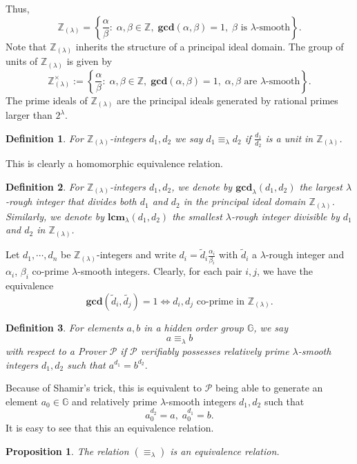 \documentclass[11pt, lettersize, notitlepage, leqno, footskip=0.6cm]{article}
\newcommand{\bz}{\mathbb Z}
\newcommand{\LRA}{\Longleftrightarrow}
\newcommand{\eqlam}{\equiv_{\lam}}
\newcommand{\wti}{\widetilde}
\newcommand{\mc}{\mathcal}
\newcommand{\mb}{\mathbb}
\newcommand{\mbf}{\mathbf}
\newcommand{\al}{\alpha}
\newcommand{\be}{\beta}
\newcommand{\lam}{\lambda}
\newcommand{\lamb}{\lambda}
\newcommand{\bzlam}{\bz_{(\lam)}}
\newcommand{\vs}{\vspace{-0.15cm}}
\newcommand{\noin}{\noindent}
\newcommand{\LCM}{\mbf{lcm}}
\newcommand{\GCD}{\mbf{gcd}}
\newtheorem{Prop}[Thm]{Proposition}
\newtheorem{Def}{Definition}[section]
\numberwithin{equation}{section}
\begin{document}
\noindent Thus, \vs $$\bz_{(\lamb)} = \left\{\frac{\al}{\be}:\; \al,\be\in\bz,\;\GCD(\al,\be) = 1,\; \be \text{ is } \lamb\text{-smooth}\right\}.$$ Note that $\bz_{(\lamb)}$ inherits the structure of a principal ideal domain. The group of units of $\bzlam$ is given by $$\bzlam^{\times} := \left\{\frac{\al}{\be}:\; \al,\be\in\bz,\;\GCD(\al,\be) = 1,\; \al, \be \text{ are } \lamb\text{-smooth}\right\}. $$ The prime ideals of $\bz_{(\lamb)}$ are the principal ideals generated by rational primes larger than $2^{\lamb}$.

\begin{Def} For $\bzlam$-integers $d_1,d_2$ we say $d_1\eqlam d_2$ if $\frac{d_1}{d_2}$ is a unit in $\bzlam$.\end{Def}

\noin This is clearly a homomorphic equivalence relation.

\begin{Def} For $\bzlam$-integers $d_1,d_2$, we denote by $\GCD_{\lam}(d_1,d_2)$ the largest $\lam$-rough integer that divides both $d_1$ and $d_2$ in the principal ideal domain $\bzlam$. Similarly, we denote by $\LCM_{\lam}(d_1,d_2)$ the smallest $\lam$-rough integer divisible by $d_1$ and $d_2$ in $\bzlam$.\end{Def}

\noin Let $d_1,\cdots,d_n$ be $\bzlam$-integers and write $d_i = \wti{d}_i\frac{\al_i}{\be_i}$ with $\wti{d}_i$ a $\lam$-rough integer and $\al_i$, $\be_i$ co-prime $\lam$-smooth integers. Clearly, for each pair $i,j$, we have the equivalence \vs $$\GCD(\wti{d}_i,\wti{d_j}) = 1\LRA d_i,d_j\text{ co-prime in }\bzlam. $$

\begin{Def} For elements $a, b$ in a hidden order group $\mb{G}$, we say \vs $$ a \equiv_{\lam} b$$ with respect to a Prover $\mc{P}$ if $\mc{P}$ verifiably possesses  relatively prime $\lamb$-smooth integers $d_1, d_2$ such that $a^{d_1} = b^{d_2}.$\end{Def}

\noindent Because of Shamir's trick, this is equivalent to $\mc{P}$ being able to generate an element $a_0\in \mb{G}$ and relatively prime $\lamb$-smooth integers $d_1, d_2$ such that \vs $$a_0^{d_2} = a, \; a_0^{d_1} = b.$$ It is easy to see that this an equivalence relation.

\begin{Prop} The relation $(\equiv_{\lam})$ is an equivalence relation.\end{Prop}
\end{document}
